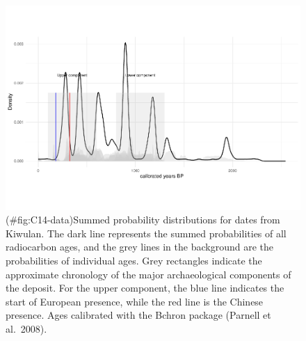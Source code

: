 \documentclass[]{article}
\begin{document}
\begin{figure}
\centering
\includegraphics{../figures/C14-data-1.pdf}
\caption{(\#fig:C14-data)Summed probability distributions for dates from
Kiwulan. The dark line represents the summed probabilities of all
radiocarbon ages, and the grey lines in the background are the
probabilities of individual ages. Grey rectangles indicate the
approximate chronology of the major archaeological components of the
deposit. For the upper component, the blue line indicates the start of
European presence, while the red line is the Chinese presence. Ages
calibrated with the Bchron package (Parnell et al.~2008).}
\end{figure}
\end{document}
